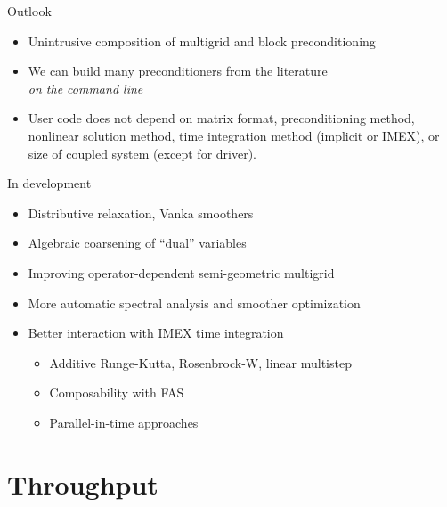 \documentclass{beamer}
\begin{document}


\begin{frame}{Outlook}
  \begin{itemize}
  \item Unintrusive composition of multigrid and block preconditioning
  \item We can build many preconditioners from the literature \\
    \emph{on the command line}
  \item User code does not depend on matrix format, preconditioning method, nonlinear solution method, time integration method (implicit or IMEX), or size of coupled system (except for driver).
  \end{itemize}
  \begin{block}{In development}
    \begin{itemize}
    \item Distributive relaxation, Vanka smoothers
    \item Algebraic coarsening of ``dual'' variables
    \item Improving operator-dependent semi-geometric multigrid
    \item More automatic spectral analysis and smoother optimization
    \item Better interaction with IMEX time integration
    \begin{itemize}
    \item Additive Runge-Kutta, Rosenbrock-W, linear multistep
    \item Composability with FAS
    \item Parallel-in-time approaches
    \end{itemize}
  \end{itemize}
\end{block}
\end{frame}

\section{Throughput}

\end{document}
